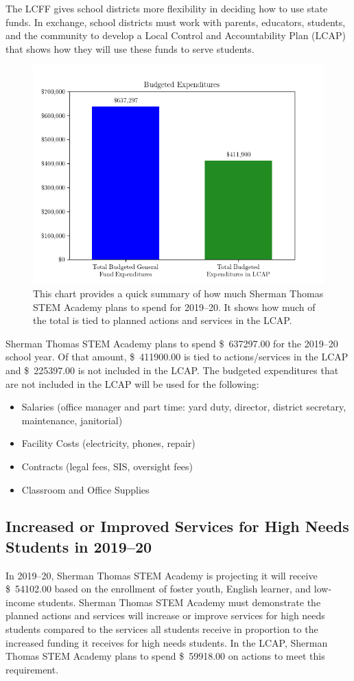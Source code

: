 \documentclass{article}
\newcommand{\dollar}[1]{\SI{#1}[\$]{}}
\newcounter{goal}[section] %
\newcounter{action}[goal]
\begin{document}
The LCFF gives school districts more flexibility in deciding how to use state funds. In exchange, school districts must work with parents, educators, students, and the community to develop a Local Control and Accountability Plan (LCAP) that shows how they will use these funds to serve students.

\begin{figure}[h!btp]
\centering
\includegraphics[scale=0.8]{expend}
\caption*{This chart provides a quick summary of how much Sherman Thomas STEM Academy plans to spend for 2019--20. It shows how much of the total is tied to planned actions and services in the LCAP.}
\end{figure}

Sherman Thomas STEM Academy plans to spend \dollar{637297.00} for the 2019--20 school year. Of that amount, \dollar{411900.00} is tied to actions/services in the LCAP and \dollar{225397.00} is not included in the LCAP. The budgeted expenditures that are not included in the LCAP will be used for the following:
\begin{itemize}[noitemsep]
	\item Salaries (office manager and part time: yard duty, director, district secretary, maintenance, janitorial)
	\item Facility Costs (electricity, phones, repair)
	\item Contracts (legal fees, SIS, oversight fees)
	\item Classroom and Office Supplies
\end{itemize}

\subsection{Increased or Improved Services for High Needs Students in 2019--20}
In 2019--20, Sherman Thomas STEM Academy is projecting it will receive \dollar{54102.00} based on the enrollment of foster youth, English learner, and low-income students. Sherman Thomas STEM Academy must demonstrate the planned actions and services will increase or improve services for high needs students compared to the services all students receive in proportion to the increased funding it receives for high needs students. In the LCAP, Sherman Thomas STEM Academy plans to spend \dollar{59918.00} on actions to meet this requirement.
\end{document}
